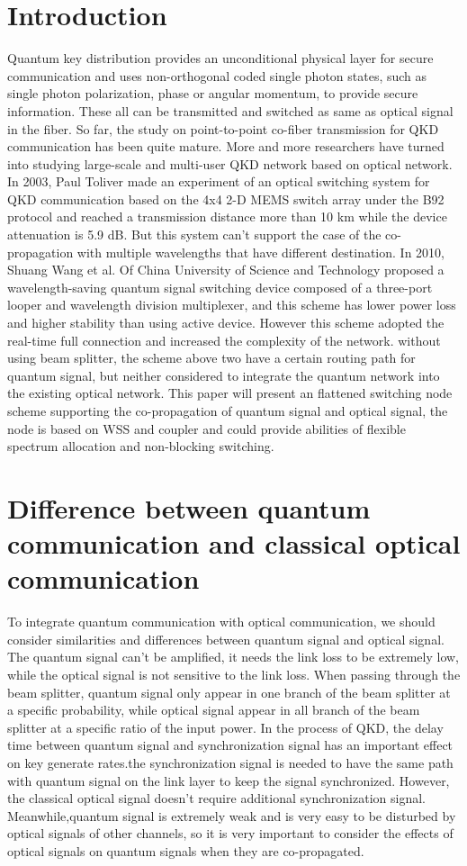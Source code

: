 \documentclass[letterpaper,10pt]{article}
\begin{document}
\section{Introduction}
Quantum key distribution provides an unconditional physical layer for secure communication and uses non-orthogonal coded single photon states, such as single photon polarization, phase or angular momentum, to provide secure information. These all can be transmitted and switched as same as optical signal in the fiber. So far, the study on point-to-point co-fiber transmission for QKD communication has been quite mature. More and more researchers have turned into studying large-scale and multi-user QKD network based on optical network. In 2003, Paul Toliver made an experiment of an optical switching system for QKD communication based on the 4x4 2-D MEMS switch array under the B92 protocol and reached a transmission distance more than 10 km while the device attenuation is 5.9 dB. But this system can't support the case of the co-propagation with multiple wavelengths that have different destination. In 2010, Shuang Wang et al. Of China University of Science and Technology proposed a wavelength-saving quantum signal switching device composed of a three-port looper and wavelength division multiplexer, and this scheme has lower power loss and higher stability than using active device.  However this scheme adopted the real-time full connection and increased the complexity of the network. without using beam splitter, the scheme above two have a certain routing path for quantum signal, but neither considered to integrate the quantum network into the existing optical network. This paper will present an flattened switching node scheme supporting the co-propagation of quantum signal and optical signal, the node is based on WSS and coupler and could provide abilities of flexible spectrum allocation and non-blocking switching.

\section{Difference between quantum communication and classical optical communication}
To integrate quantum communication with optical communication, we should consider similarities and differences between quantum signal and optical signal. The quantum signal can't be amplified, it needs the link loss to be extremely low, while the optical signal is not sensitive to the link loss. When passing through the beam splitter, quantum signal only appear in one branch of the beam splitter at a specific probability, while optical signal appear in all branch of the beam splitter at a specific ratio of the input power. In the process of QKD, the delay time between quantum signal and synchronization signal has an important effect on key generate rates.the synchronization signal is needed to have the same path with quantum signal on the link layer to keep the signal synchronized. However, the classical optical signal doesn't require additional synchronization signal. Meanwhile,quantum signal is extremely weak and is very easy to be disturbed by optical signals of other channels, so it is very important to consider the effects of optical signals on quantum signals when they are co-propagated. 
\end{document}

